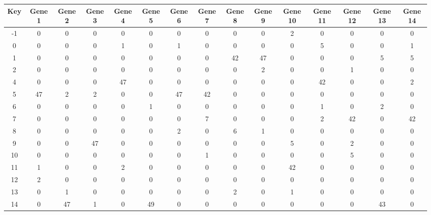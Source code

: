\begin{tabular}{|c|c|c|c|c|c|c|c|c|c|c|c|c|c|c|}
\hline
Key & Gene 1 & Gene 2 & Gene 3 & Gene 4 & Gene 5 & Gene 6 & Gene 7 & Gene 8 & Gene 9 & Gene 10 & Gene 11 & Gene 12 & Gene 13 & Gene 14 \\
\hline
-1 & 0 & 0 & 0 & 0 & 0 & 0 & 0 & 0 & 0 & 2 & 0 & 0 & 0 & 0 \\
0 & 0 & 0 & 0 & 1 & 0 & 1 & 0 & 0 & 0 & 0 & 5 & 0 & 0 & 1 \\
1 & 0 & 0 & 0 & 0 & 0 & 0 & 0 & 42 & 47 & 0 & 0 & 0 & 5 & 5 \\
2 & 0 & 0 & 0 & 0 & 0 & 0 & 0 & 0 & 2 & 0 & 0 & 1 & 0 & 0 \\
4 & 0 & 0 & 0 & 47 & 0 & 0 & 0 & 0 & 0 & 0 & 42 & 0 & 0 & 2 \\
5 & 47 & 2 & 2 & 0 & 0 & 47 & 42 & 0 & 0 & 0 & 0 & 0 & 0 & 0 \\
6 & 0 & 0 & 0 & 0 & 1 & 0 & 0 & 0 & 0 & 0 & 1 & 0 & 2 & 0 \\
7 & 0 & 0 & 0 & 0 & 0 & 0 & 7 & 0 & 0 & 0 & 2 & 42 & 0 & 42 \\
8 & 0 & 0 & 0 & 0 & 0 & 2 & 0 & 6 & 1 & 0 & 0 & 0 & 0 & 0 \\
9 & 0 & 0 & 47 & 0 & 0 & 0 & 0 & 0 & 0 & 5 & 0 & 2 & 0 & 0 \\
10 & 0 & 0 & 0 & 0 & 0 & 0 & 1 & 0 & 0 & 0 & 0 & 5 & 0 & 0 \\
11 & 1 & 0 & 0 & 2 & 0 & 0 & 0 & 0 & 0 & 42 & 0 & 0 & 0 & 0 \\
12 & 2 & 0 & 0 & 0 & 0 & 0 & 0 & 0 & 0 & 0 & 0 & 0 & 0 & 0 \\
13 & 0 & 1 & 0 & 0 & 0 & 0 & 0 & 2 & 0 & 1 & 0 & 0 & 0 & 0 \\
14 & 0 & 47 & 1 & 0 & 49 & 0 & 0 & 0 & 0 & 0 & 0 & 0 & 43 & 0 \\
\hline
\end{tabular}